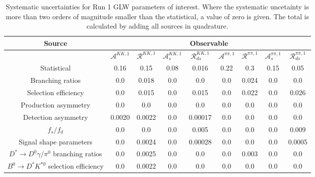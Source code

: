 \begin{sidewaystable}
  \centering
  \begin{tabular}{ccccccccc}
      \toprule
      Source & \multicolumn{8}{c}{Observable} \\
      \midrule
       & $\mathcal{A}^{KK,1}$ & $\mathcal{R}^{KK,1}$ & $\mathcal{A}_s^{KK,1}$ & $\mathcal{R}_{ds}^{KK,1}$ & $\mathcal{A}^{\pi\pi,1}$ & $\mathcal{R}^{\pi\pi,1}$ & $\mathcal{A}_s^{\pi\pi,1}$ & $\mathcal{R}_{ds}^{\pi\pi,1}$ \\
      \midrule
      Statistical & 0.16 & 0.15 & 0.08 & 0.016 & 0.22 & 0.3 & 0.15 & 0.05 \\
      \midrule
      Branching ratios & 0.0  & 0.018 & 0.0  & 0.0  & 0.0  & 0.024 & 0.0  & 0.0  \\
      Selection efficiency & 0.0  & 0.015 & 0.0  & 0.015 & 0.0  & 0.022 & 0.0  & 0.026 \\
      Production asymmetry & 0.0  & 0.0  & 0.0  & 0.0  & 0.0  & 0.0  & 0.0  & 0.0  \\
      Detection asymmetry & 0.0020 & 0.0022 & 0.0  & 0.00017 & 0.0  & 0.0  & 0.0  & 0.0  \\
      $f_s/f_d$ & 0.0  & 0.0  & 0.0  & 0.005 & 0.0  & 0.0  & 0.0  & 0.009 \\
      Signal shape parameters & 0.0  & 0.0024 & 0.0  & 0.00028 & 0.0  & 0.0  & 0.0  & 0.0005 \\
      $D^* \to D^0 \gamma/\pi^0$ branching ratios & 0.0  & 0.0025 & 0.0  & 0.0  & 0.0  & 0.003 & 0.0  & 0.0  \\
      $B^0 \to D^* K^{*0}$ selection efficiency & 0.0  & 0.0022 & 0.0  & 0.0  & 0.0  & 0.0  & 0.0  & 0.0  \\
      \bottomrule
  \end{tabular}
  \caption{Systematic uncertainties for Run 1 GLW parameters of interest. Where the systematic uncetainty is more than two orders of magnitude smaller than the statistical, a value of zero is given. The total is calculated by adding all sources in quadrature.}
\label{tab:KK_run1_systematics}
\end{sidewaystable}
